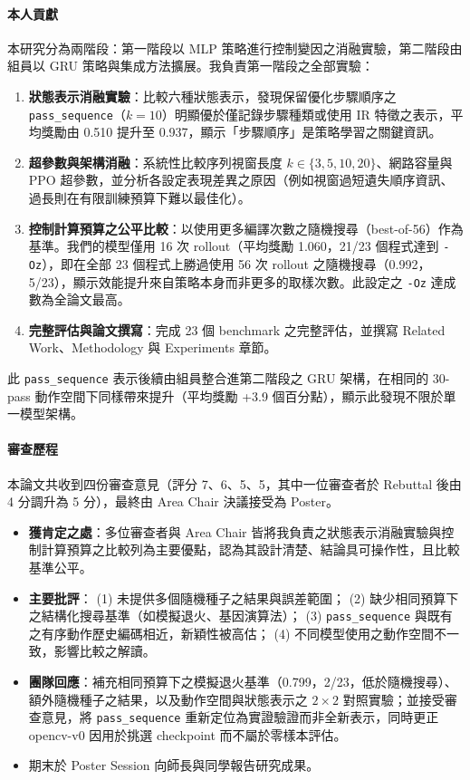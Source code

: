 \documentclass[12pt,a4paper]{article}
\begin{document}
\paragraph{本人貢獻}
本研究分為兩階段：第一階段以 MLP 策略進行控制變因之消融實驗，第二階段由組員以 GRU 策略與集成方法擴展。我負責第一階段之全部實驗：
\begin{enumerate}[leftmargin=2em]
  \item \textbf{狀態表示消融實驗}：比較六種狀態表示，發現保留優化步驟順序之 \texttt{pass\_sequence}（$k=10$）明顯優於僅記錄步驟種類或使用 IR 特徵之表示，平均獎勵由 0.510 提升至 0.937，顯示「步驟順序」是策略學習之關鍵資訊。
  \item \textbf{超參數與架構消融}：系統性比較序列視窗長度 $k \in \{3,5,10,20\}$、網路容量與 PPO 超參數，並分析各設定表現差異之原因（例如視窗過短遺失順序資訊、過長則在有限訓練預算下難以最佳化）。
  \item \textbf{控制計算預算之公平比較}：以使用更多編譯次數之隨機搜尋（best-of-56）作為基準。我們的模型僅用 16 次 rollout（平均獎勵 1.060，21/23 個程式達到 \texttt{-Oz}），即在全部 23 個程式上勝過使用 56 次 rollout 之隨機搜尋（0.992，5/23），顯示效能提升來自策略本身而非更多的取樣次數。此設定之 \texttt{-Oz} 達成數為全論文最高。
  \item \textbf{完整評估與論文撰寫}：完成 23 個 benchmark 之完整評估，並撰寫 Related Work、Methodology 與 Experiments 章節。
\end{enumerate}

此 \texttt{pass\_sequence} 表示後續由組員整合進第二階段之 GRU 架構，在相同的 30-pass 動作空間下同樣帶來提升（平均獎勵 +3.9 個百分點），顯示此發現不限於單一模型架構。

\paragraph{審查歷程}
本論文共收到四份審查意見（評分 7、6、5、5，其中一位審查者於 Rebuttal 後由 4 分調升為 5 分），最終由 Area Chair 決議接受為 Poster。
\begin{itemize}[leftmargin=2em]
  \item \textbf{獲肯定之處}：多位審查者與 Area Chair 皆將我負責之狀態表示消融實驗與控制計算預算之比較列為主要優點，認為其設計清楚、結論具可操作性，且比較基準公平。
  \item \textbf{主要批評}：
  (1) 未提供多個隨機種子之結果與誤差範圍；
  (2) 缺少相同預算下之結構化搜尋基準（如模擬退火、基因演算法）；
  (3) \texttt{pass\_sequence} 與既有之有序動作歷史編碼相近，新穎性被高估；
  (4) 不同模型使用之動作空間不一致，影響比較之解讀。
  \item \textbf{團隊回應}：補充相同預算下之模擬退火基準（0.799，2/23，低於隨機搜尋）、額外隨機種子之結果，以及動作空間與狀態表示之 $2\times2$ 對照實驗；並接受審查意見，將 \texttt{pass\_sequence} 重新定位為實證驗證而非全新表示，同時更正 opencv-v0 因用於挑選 checkpoint 而不屬於零樣本評估。
  \item 期末於 Poster Session 向師長與同學報告研究成果。
\end{itemize}
\end{document}
